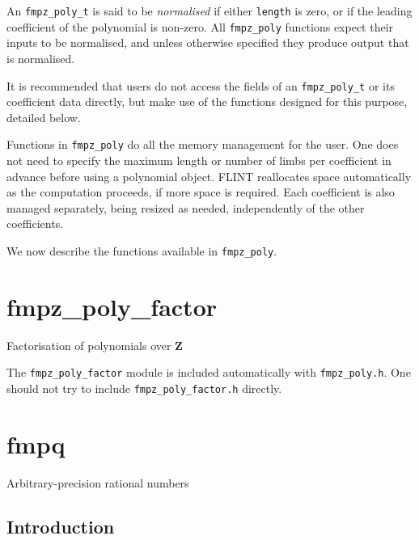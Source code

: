 \documentclass[a4paper,10pt]{book}
\newcommand{\Z}{\mathbf{Z}}%
\newcommand{\code}{\lstinline}
\begin{document}
{{An \code{fmpz_poly_t} is said to be \emph{normalised} if either
\code{length} is zero, or if the leading coefficient of the polynomial is
non-zero.  All \code{fmpz_poly} functions expect their inputs to be
normalised, and unless otherwise specified they produce output that is
normalised.

It is recommended that users do not access the fields of an
\code{fmpz_poly_t} or its coefficient data directly, but make use of the
functions designed for this purpose, detailed below.

Functions in \code{fmpz_poly} do all the memory management for the user.
One does not need to specify the maximum length or number of limbs per
coefficient in advance before using a polynomial object.  FLINT reallocates
space automatically as the computation proceeds, if more space is required.
Each coefficient is also managed separately, being resized as needed,
independently of the other coefficients.

We now describe the functions available in \code{fmpz_poly}.




\chapter{fmpz\_poly\_factor}
\epigraph{Factorisation of polynomials over $\Z$}{}

The \code{fmpz_poly_factor} module is included automatically with
\code{fmpz_poly.h}. One should not try to include \code{fmpz_poly_factor.h}
directly.




\chapter{fmpq}
\epigraph{Arbitrary-precision rational numbers}{}

\section{Introduction}

}}
\end{document}
